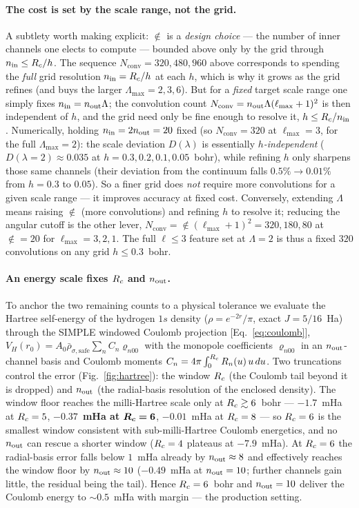\paragraph*{The cost is set by the scale range, not the grid.}
A subtlety worth making explicit: $\nin$ is a \emph{design choice} --- the number of
inner channels one elects to compute --- bounded above only by the grid through
$n_{\mathrm{in}}\le R_{c}/h$. The sequence $N_{\mathrm{conv}}=320,480,960$ above corresponds to
spending the \emph{full} grid resolution $n_{\mathrm{in}}=R_{c}/h$ at each $h$, which is why it grows
as the grid refines (and buys the larger $\Lambda_{\max}=2,3,6$). But for a \emph{fixed}
target scale range one simply fixes $n_{\mathrm{in}}=n_{\mathrm{out}}\Lambda$; the convolution count
$N_{\mathrm{conv}}=n_{\mathrm{out}}\Lambda(\ell_{\max}+1)^2$ is then independent of $h$, and the
grid need only be fine enough to resolve it, $h\le R_{c}/n_{\mathrm{in}}$. Numerically, holding
$n_{\mathrm{in}}=2n_{\mathrm{out}}=20$ fixed (so $N_{\mathrm{conv}}=320$ at $\ell_{\max}=3$, for the full
$\Lambda_{\max}=2$): the scale deviation $D(\lambda)$ is essentially
\emph{$h$-independent} ($D(\lambda{=}2)\approx0.035$ at $h=0.3,0.2,0.1,0.05$~bohr), while
refining $h$ only sharpens those same channels (their deviation from the continuum falls
$0.5\%\!\to\!0.01\%$ from $h=0.3$ to $0.05$). So a finer grid does \emph{not} require
more convolutions for a given scale range --- it improves accuracy at fixed cost.
Conversely, extending $\Lambda$ means raising $\nin$ (more convolutions) and refining $h$
to resolve it; reducing the angular cutoff is the other lever, $N_{\mathrm{conv}}=
\nin(\ell_{\max}+1)^2 = 320,180,80$ at $\nin=20$ for $\ell_{\max}=3,2,1$. The full
$\ell\le3$ feature set at $\Lambda=2$ is thus a fixed $320$ convolutions on any grid
$h\le0.3$~bohr.

\paragraph*{An energy scale fixes $R_{c}$ and $n_{\mathrm{out}}$.}
To anchor the two remaining counts to a physical tolerance we evaluate the Hartree
self-energy of the hydrogen $1s$ density ($\rho=e^{-2r}/\pi$, exact $J=5/16$~Ha) through
the SIMPLE windowed Coulomb projection [Eq.~\eqref{eq:coulomb}],
$V_H(r_0)=A_0\bar\rho_{\sigma,\mathrm{safe}}\sum_n C_n\varrho_{n00}$ with the monopole coefficients
$\varrho_{n00}$ in an $n_{\mathrm{out}}$-channel basis and Coulomb moments
$C_n=4\pi\int_0^{R_{c}}R_n(u)\,u\,du$. Two truncations control the error
(Fig.~\ref{fig:hartree}): the window $R_{c}$ (the Coulomb tail beyond it is dropped) and
$n_{\mathrm{out}}$ (the radial-basis resolution of the enclosed density). The window floor reaches
the milli-Hartree scale only at $R_{c}\gtrsim6$~bohr --- $-1.7$~mHa at $R_{c}=5$,
$\mathbf{-0.37}$~\textbf{mHa at} $\boldsymbol{R_{c}=6}$, $-0.01$~mHa at $R_{c}=8$ --- so
$R_{c}=6$ is the smallest window consistent with sub-milli-Hartree Coulomb energetics, and
no $n_{\mathrm{out}}$ can rescue a shorter window ($R_{c}=4$ plateaus at $-7.9$~mHa). At $R_{c}=6$ the
radial-basis error falls below $1$~mHa already by $n_{\mathrm{out}}\approx8$ and effectively
reaches the window floor by $n_{\mathrm{out}}\approx10$ ($-0.49$~mHa at $n_{\mathrm{out}}=10$; further channels
gain little, the residual being the tail). Hence $R_{c}=6$~bohr and $n_{\mathrm{out}}=10$ deliver the
Coulomb energy to ${\sim}0.5$~mHa with margin --- the production setting.

